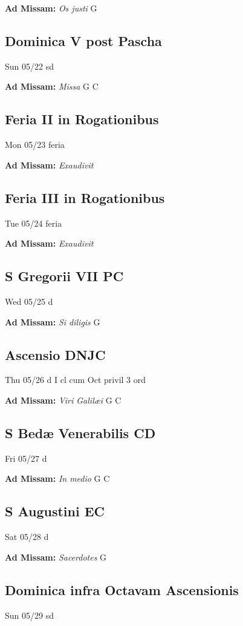 \documentclass[letterpaper, 10pt, twocolumn]{article}
\begin{document}
\textbf{Ad Missam:} \textit{Os justi} G 

\subsection*{Dominica V post Pascha}Sun 05/22 sd

\textbf{Ad Missam:} \textit{Missa} G C 

\subsection*{Feria II in Rogationibus}Mon 05/23 feria

\textbf{Ad Missam:} \textit{Exaudivit} 

\subsection*{Feria III in Rogationibus}Tue 05/24 feria

\textbf{Ad Missam:} \textit{Exaudivit} 

\subsection*{S Gregorii VII PC}Wed 05/25 d

\textbf{Ad Missam:} \textit{Si diligis} G 

\subsection*{Ascensio DNJC}Thu 05/26 d I cl cum Oct privil 3 ord

\textbf{Ad Missam:} \textit{Viri Galilæi} G C 

\subsection*{S Bedæ Venerabilis CD}Fri 05/27 d

\textbf{Ad Missam:} \textit{In medio} G C 

\subsection*{S Augustini EC}Sat 05/28 d

\textbf{Ad Missam:} \textit{Sacerdotes} G 

\subsection*{Dominica infra Octavam Ascensionis}Sun 05/29 sd
\end{document}

